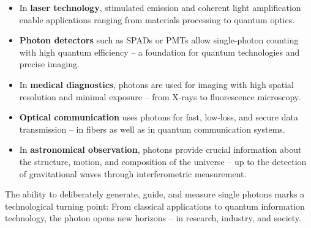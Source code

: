 \begin{itemize}
	\item In \textbf{laser technology}, stimulated emission and coherent light amplification enable applications ranging from materials processing to quantum optics.
	\item \textbf{Photon detectors} such as SPADs or PMTs allow single-photon counting with high quantum efficiency – a foundation for quantum technologies and precise imaging.
	\item In \textbf{medical diagnostics}, photons are used for imaging with high spatial resolution and minimal exposure – from X-rays to fluorescence microscopy.
	\item \textbf{Optical communication} uses photons for fast, low-loss, and secure data transmission – in fibers as well as in quantum communication systems.
	\item In \textbf{astronomical observation}, photons provide crucial information about the structure, motion, and composition of the universe – up to the detection of gravitational waves through interferometric measurement.
\end{itemize}

The ability to deliberately generate, guide, and measure single photons marks a technological turning point: From classical applications to quantum information technology, the photon opens new horizons – in research, industry, and society.
